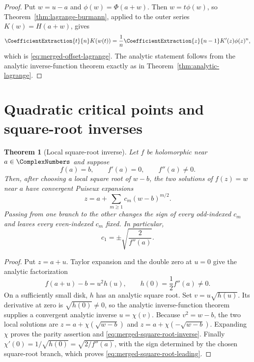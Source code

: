 \documentclass[11pt,a4paper,oneside,openany]{book}
\newtheorem{theorem}{Theorem}[chapter]
\theoremstyle{definition}
\theoremstyle{remark}
\begin{document}
\begin{proof}
Put $w=u-a$ and $\phi(w)=\Phi(a+w)$.  Then $w=t\phi(w)$, so
Theorem~\ref{thm:lagrange-burmann}, applied to the outer series
$K(w)=H(a+w)$, gives
\[
 \CoefficientExtraction{t}{n}K(w(t))=\frac1n\CoefficientExtraction{z}{n-1}K'(z)\phi(z)^n,
\]
which is \eqref{eq:merged-offset-lagrange}.  The analytic statement follows
from the analytic inverse-function theorem exactly as in
Theorem~\ref{thm:analytic-lagrange}.
\end{proof}

\section{Quadratic critical points and square-root inverses}

\begin{theorem}[Local square-root inverse]
\label{thm:merged-square-root-inverse}
Let $f$ be holomorphic near $a\in\ComplexNumbers$ and suppose
\[
 f(a)=b,\qquad f'(a)=0,\qquad f''(a)\ne0.
\]
Then, after choosing a local square root of $w-b$, the two solutions of
$f(z)=w$ near $a$ have convergent Puiseux expansions
\begin{equation}
 z=a+\sum_{m\ge1}c_m(w-b)^{m/2}.                                  \label{eq:merged-square-root-inverse}
\end{equation}
Passing from one branch to the other changes the sign of every odd-indexed
$c_m$ and leaves every even-indexed $c_m$ fixed.  In particular,
\begin{equation}
 c_1=\pm\sqrt{\frac{2}{f''(a)}}.                                  \label{eq:merged-square-root-leading}
\end{equation}
\end{theorem}

\begin{proof}
Put $z=a+u$.  Taylor expansion and the double zero at $u=0$ give the analytic
factorization
\[
 f(a+u)-b=u^2h(u),\qquad h(0)=\frac12f''(a)\ne0.
\]
On a sufficiently small disk, $h$ has an analytic square root.  Set
$v=u\sqrt{h(u)}$.  Its derivative at zero is $\sqrt{h(0)}\ne0$, so the
analytic inverse-function theorem supplies a convergent analytic inverse
$u=\chi(v)$.  Because $v^2=w-b$, the two local solutions are
$z=a+\chi(\sqrt{w-b})$ and $z=a+\chi(-\sqrt{w-b})$.  Expanding $\chi$
proves the parity assertion and \cref{eq:merged-square-root-inverse}.  Finally
$\chi'(0)=1/\sqrt{h(0)}=\sqrt{2/f''(a)}$, with the sign determined by the
chosen square-root branch, which proves \cref{eq:merged-square-root-leading}.
\end{proof}
\end{document}
